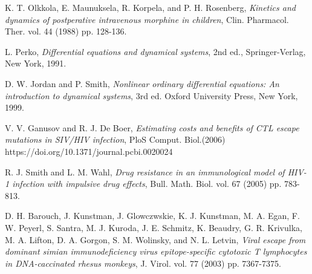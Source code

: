 \documentclass[11pt, oneside]{article}    %
\begin{document}
\begin{thebibliography}{99}

K. T. Olkkola, E. Maunuksela, R. Korpela, and P. H. Rosenberg,  {\em Kinetics and dynamics of postperative intravenous morphine in children}, Clin. Pharmacol. Ther. vol. 44 (1988) pp. 128-136.

L. Perko, {\em Differential equations and dynamical systems}, 2nd ed., Springer-Verlag, New York, 1991.

D. W. Jordan and P. Smith,  {\em Nonlinear ordinary differential equations: An introduction to dynamical systems}, 3rd ed. Oxford University Press, New York, 1999.

V. V. Ganusov and R. J. De Boer, {\em Estimating costs and benefits of CTL escape mutations in SIV/HIV infection}, PloS Comput. Biol.(2006) https://doi.org/10.1371/journal.pcbi.0020024

R. J. Smith and L. M. Wahl,  {\em Drug resistance in an immunological model of HIV-1 infection with impulsive drug effects}, Bull. Math. Biol. vol. 67 (2005) pp. 783-813.

D. H. Barouch, J. Kunstman, J. Glowczwskie, K. J. Kunstman, M. A. Egan, F. W. Peyerl, S. Santra, M. J. Kuroda, J. E. Schmitz, K. Beaudry, G. R. Krivulka, M. A. Lifton, D. A. Gorgon, S. M. Wolinsky, and N. L. Letvin,  {\em Viral escape from dominant simian immunodeficiency virus epitope-specific cytotoxic T lymphocytes in DNA-caccinated rhesus monkeys}, J. Virol. vol. 77 (2003) pp. 7367-7375.


\end{thebibliography}
\end{document}
